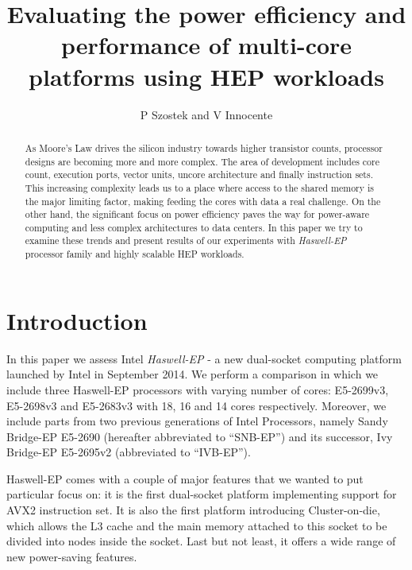 \documentclass[a4paper]{jpconf}
\begin{document}
\title{Evaluating the power efficiency and performance of multi-core platforms using HEP workloads}
\author{P Szostek and V Innocente}
\address{CERN, Geneva 23, CH-1211, Switzerland}
\begin{abstract}
As Moore's Law drives the silicon industry towards higher transistor counts, processor designs are becoming more and more complex. The area of development includes core count, execution ports, vector units, uncore architecture and finally instruction sets. This increasing complexity leads us to a place where access to the shared memory is the major limiting factor, making feeding the cores with data a real challenge. On the other hand, the significant focus on power efficiency paves the way for power-aware computing and less complex architectures to data centers. In this paper we try to examine these trends and present results of our experiments with \textit{Haswell-EP} processor family and highly scalable HEP workloads.
\end{abstract}


\section{Introduction}
In this paper we assess Intel \textit{Haswell-EP} - a new dual-socket computing platform launched by Intel in September 2014. We perform a comparison in which we include three Haswell-EP processors with varying number of cores: E5-2699v3, E5-2698v3 and E5-2683v3 with 18, 16 and 14 cores respectively. Moreover, we include parts from two previous generations of Intel Processors, namely Sandy Bridge-EP E5-2690 (hereafter abbreviated to ``SNB-EP'') and its successor, Ivy Bridge-EP E5-2695v2 (abbreviated to ``IVB-EP'').

Haswell-EP comes with a couple of major features that we wanted to put particular focus on: it is the first dual-socket platform implementing support for AVX2 instruction set. It is also the first platform introducing Cluster-on-die, which allows the L3 cache and the main memory attached to this socket to be divided into nodes inside the socket. Last but not least, it offers a wide range of new power-saving features.
\end{document}

